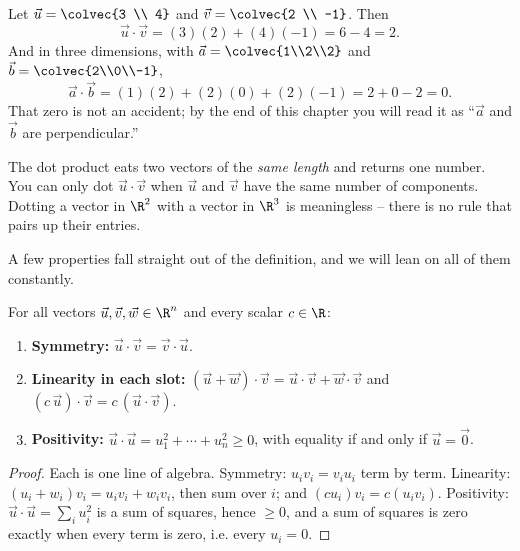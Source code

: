 \begin{example}\label{ch04:first-dot}
Let $\vec u = \colvec{3 \\ 4}$ and $\vec v = \colvec{2 \\ -1}$. Then
\[
  \vec u \cdot \vec v = (3)(2) + (4)(-1) = 6 - 4 = 2.
\]
And in three dimensions, with $\vec a = \colvec{1\\2\\2}$ and
$\vec b = \colvec{2\\0\\-1}$,
\[
  \vec a\cdot\vec b = (1)(2) + (2)(0) + (2)(-1) = 2 + 0 - 2 = 0.
\]
That zero is not an accident; by the end of this chapter you will read it as
``$\vec a$ and $\vec b$ are perpendicular.''
\end{example}

\begin{focusbox}
The dot product eats two vectors of the \emph{same length} and returns one number.
You can only dot $\vec u\cdot\vec v$ when $\vec u$ and $\vec v$ have the same
number of components. Dotting a vector in $\R^2$ with a vector in $\R^3$ is
meaningless -- there is no rule that pairs up their entries.
\end{focusbox}

A few properties fall straight out of the definition, and we will lean on all of
them constantly.

\begin{formalbox}
For all vectors $\vec u, \vec v, \vec w \in \R^n$ and every scalar $c\in\R$:
\begin{enumerate}
  \item \textbf{Symmetry:} $\vec u\cdot\vec v = \vec v\cdot\vec u$.
  \item \textbf{Linearity in each slot:}
        $(\vec u + \vec w)\cdot\vec v = \vec u\cdot\vec v + \vec w\cdot\vec v$
        and $(c\,\vec u)\cdot\vec v = c\,(\vec u\cdot\vec v)$.
  \item \textbf{Positivity:} $\vec u\cdot\vec u = u_1^2 + \cdots + u_n^2 \ge 0$,
        with equality if and only if $\vec u = \vec 0$.
\end{enumerate}
\end{formalbox}

\begin{proof}
Each is one line of algebra. Symmetry: $u_iv_i = v_iu_i$ term by term.
Linearity: $(u_i+w_i)v_i = u_iv_i + w_iv_i$, then sum over $i$; and
$(cu_i)v_i = c(u_iv_i)$. Positivity: $\vec u\cdot\vec u = \sum_i u_i^2$ is a sum of
squares, hence $\ge 0$, and a sum of squares is zero exactly when every term is
zero, i.e. every $u_i=0$.
\end{proof}


